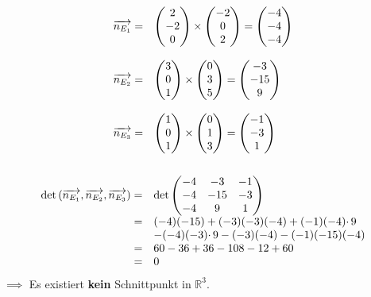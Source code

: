 \documentclass[main.tex]{subfiles}
\begin{document}
\begin{gather*}
\begin{array}{ r l }
\overrightarrow{n_{E_{1}}} = & \begin{pmatrix}
2\\
-2\\
0
\end{pmatrix} \times \begin{pmatrix}
-2\\
0\\
2
\end{pmatrix} =\begin{pmatrix}
-4\\
-4\\
-4
\end{pmatrix}\\
    & \\
\overrightarrow{n_{E_{2}}} = & \begin{pmatrix}
3\\
0\\
1
\end{pmatrix} \times \begin{pmatrix}
0\\
3\\
5
\end{pmatrix} =\begin{pmatrix}
-3\\
-15\\
9
\end{pmatrix}\\
    & \\
\overrightarrow{n_{E_{3}}} = & \begin{pmatrix}
1\\
0\\
1
\end{pmatrix} \times \begin{pmatrix}
0\\
1\\
3
\end{pmatrix} =\begin{pmatrix}
-1\\
-3\\
1
\end{pmatrix}
\end{array}\\
\\
\begin{array}{ r l }
\det\left(\overrightarrow{n_{E_{1}}} ,\overrightarrow{n_{E_{2}}} ,\overrightarrow{n_{E_{3}}}\right) = & \det\begin{pmatrix}
-4 & -3 & -1\\
-4 & -15 & -3\\
-4 & 9 & 1
\end{pmatrix}\\
= & ( -4)( -15) +( -3)( -3)( -4) +( -1)( -4) \cdotp 9\\
 & -( -4)( -3) \cdotp 9-( -3)( -4) -( -1)( -15)( -4)\\
= & 60-36+36-108-12+60\\
= & 0
\end{array}
\end{gather*}
$\implies$ Es existiert \textbf{kein} Schnittpunkt in $\mathbb{R}^{3}$.
\end{document}

